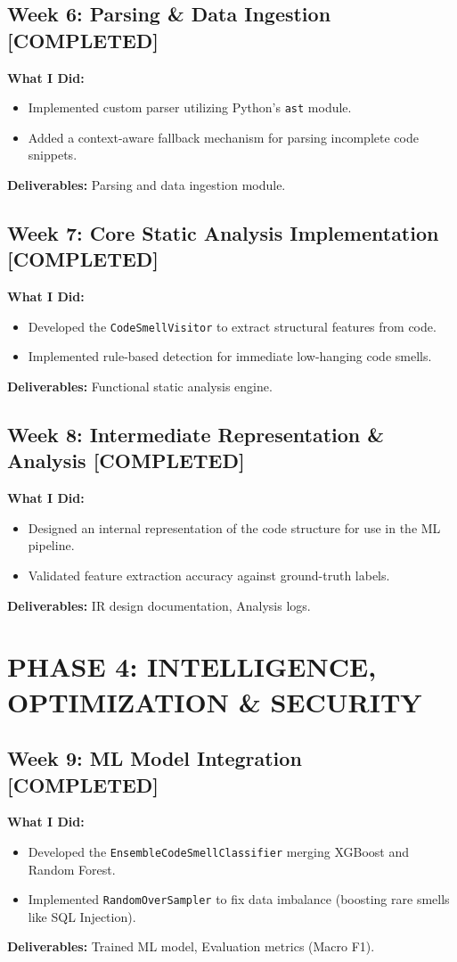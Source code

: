 \documentclass[11pt,a4paper]{article}
\newcommand{\status}[2]{\hfill \textcolor{#1}{\textbf{[#2]}}}
\begin{document}
\subsection*{Week 6: Parsing \& Data Ingestion \status{compcolor}{COMPLETED}}
\textbf{What I Did:}
\begin{itemize}[noitemsep]
    \item Implemented custom parser utilizing Python's \texttt{ast} module.
    \item Added a context-aware fallback mechanism for parsing incomplete code snippets.
\end{itemize}
\textbf{Deliverables:} Parsing and data ingestion module.

\subsection*{Week 7: Core Static Analysis Implementation \status{compcolor}{COMPLETED}}
\textbf{What I Did:}
\begin{itemize}[noitemsep]
    \item Developed the \texttt{CodeSmellVisitor} to extract structural features from code.
    \item Implemented rule-based detection for immediate low-hanging code smells.
\end{itemize}
\textbf{Deliverables:} Functional static analysis engine.

\subsection*{Week 8: Intermediate Representation \& Analysis \status{compcolor}{COMPLETED}}
\textbf{What I Did:}
\begin{itemize}[noitemsep]
    \item Designed an internal representation of the code structure for use in the ML pipeline.
    \item Validated feature extraction accuracy against ground-truth labels.
\end{itemize}
\textbf{Deliverables:} IR design documentation, Analysis logs.

\section*{PHASE 4: INTELLIGENCE, OPTIMIZATION \& SECURITY}

\subsection*{Week 9: ML Model Integration \status{compcolor}{COMPLETED}}
\textbf{What I Did:}
\begin{itemize}[noitemsep]
    \item Developed the \texttt{EnsembleCodeSmellClassifier} merging XGBoost and Random Forest.
    \item Implemented \texttt{RandomOverSampler} to fix data imbalance (boosting rare smells like SQL Injection).
\end{itemize}
\textbf{Deliverables:} Trained ML model, Evaluation metrics (Macro F1).
\end{document}
